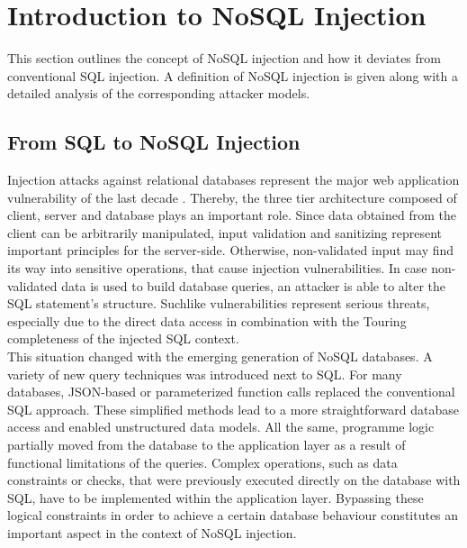 \chapter{Introduction to NoSQL Injection}
\label{cha:intro_to_nosql_injection}
This section outlines the concept of NoSQL injection and how it deviates from conventional SQL injection. A definition of NoSQL injection is given along with a detailed analysis of the corresponding attacker models.

\section{From SQL to NoSQL Injection}
\label{sec:fromSQLtoNoSQLinjection}
Injection attacks against relational databases represent the major web application vulnerability of the last decade \cite{OWASP:2013b}. Thereby, the three tier architecture composed of client, server and database plays an important role. Since data obtained from the client can be arbitrarily manipulated, input validation and sanitizing represent important principles for the server-side. Otherwise, non-validated input may find its way into sensitive operations, that cause injection vulnerabilities. In case non-validated data is used to build database queries, an attacker is able to alter the SQL statement's structure. Suchlike vulnerabilities represent serious threats, especially due to the direct data access in combination with the Touring completeness of the injected SQL context.\\ 

This situation changed with the emerging generation of NoSQL databases. A variety of new query techniques was introduced next to SQL. For many databases, JSON-based or parameterized function calls replaced the conventional SQL approach. These simplified methods lead to a more straightforward database access and enabled unstructured data models. All the same, programme logic partially moved from the database to the application layer as a result of functional limitations of the queries. Complex operations, such as data constraints or checks, that were previously executed directly on the database with SQL, have to be implemented within the application layer. Bypassing these logical constraints in order to achieve a certain database behaviour constitutes an important aspect in the context of NoSQL injection. \\ 

